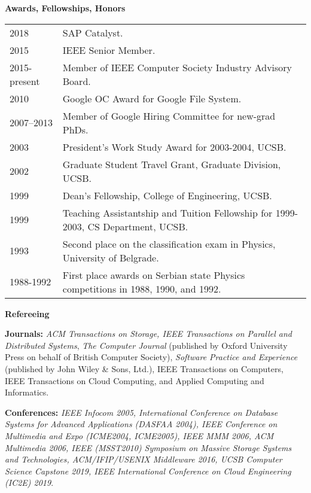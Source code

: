 \documentclass[10pt]{article}
\renewcommand{\section}[1]{ \vspace{10pt}\begin{flushleft}{\hspace{-0.2in }\Large\bf
    #1}\end{flushleft}\nopagebreak }
\begin{document}
\section{Awards, Fellowships, Honors}
\begin{tabular}{ll}
2018 	& SAP Catalyst. \\
2015 	& IEEE Senior Member. \\
2015-present 	& Member of IEEE Computer Society Industry Advisory Board. \\
2010 	& Google OC Award for Google File System. \\
2007--2013      & Member of Google Hiring Committee for new-grad PhDs.\\
2003 	& President's Work Study Award for 2003-2004, UCSB. \\
2002	& Graduate Student Travel Grant, Graduate Division, UCSB.\\
1999 	& Dean's Fellowship, College of Engineering, UCSB. \\
1999 	& Teaching Assistantship and Tuition Fellowship for 1999-2003, 
		CS Department, UCSB. \\
1993 	& Second place on the classification exam in Physics, University of Belgrade. \\
1988-1992 & First place awards on Serbian state Physics competitions in 
		1988, 1990, and 1992.
\end{tabular}


\section{Refereeing}

{\bf Journals:}
{\em ACM Transactions on Storage, IEEE Transactions on Parallel and Distributed Systems},
{\em The Computer Journal} (published by Oxford University Press on behalf of
British Computer Society), {\em Software Practice and Experience}
(published by John Wiley \& Sons, Ltd.), IEEE Transactions on Computers, 
IEEE Transactions on Cloud Computing, and Applied Computing and Informatics.

{\bf Conferences:}
{\em IEEE Infocom 2005, International Conference on Database Systems for
Advanced Applications (DASFAA 2004), IEEE Conference on Multimedia and
Expo (ICME2004, ICME2005), IEEE MMM 2006, ACM Multimedia 2006, IEEE (MSST2010) Symposium on 
Massive Storage Systems and Technologies, ACM/IFIP/USENIX Middleware 2016, UCSB Computer Science Capstone 2019,
IEEE International Conference on Cloud Engineering (IC2E) 2019}.
\end{document}

